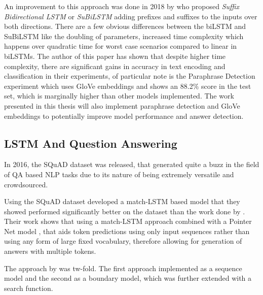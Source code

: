 \documentclass[a4paper,12pt]{report}
\begin{document}
			  An improvement to this approach was done in 2018 by \citep{lstmSubilstm} who proposed \textit{Suffix Bidirectional LSTM} or \textit{SuBiLSTM} adding prefixes and suffixes to the inputs over both directions.  There are a few obvious differences between the biLSTM and SuBiLSTM like the doubling of parameters, increased time complexity which happens over quadratic time for worst case scenarios compared to linear in biLSTMs.
			  The author of this paper has shown that despite higher time complexity, there are significant gains in accuracy in text encoding and classification in their experiments, of particular note is the Paraphrase Detection experiment which uses GloVe embeddings and shows an 88.2\% score in the test set, which is marginally higher than other models implemented.
			  The work presented in this thesis will also implement paraphrase detection and GloVe embeddings to potentially improve model performance and answer detection.

			  \subsection{LSTM And Question Answering}\label{c2lstmqa}
             In 2016, the SQuAD dataset \citep{dataset1} was released, that generated quite a buzz in the field of QA based NLP tasks due to its nature of being extremely versatile and crowdsourced.

             Using the SQuAD dataset \citep{lstmhu2016question} developed a match-LSTM \citep{lstmMatch} based model that they showed performed significantly better on the dataset than the work done by \citep{dataset1}. Their work shows that using a match-LSTM approach combined with a Pointer Net model \citep{lstmPointer}, that aids token predictions using only input sequences rather than using any form of large fixed vocabulary, therefore allowing for generation of answers with multiple tokens.

             The approach by \citep{lstmhu2016question} was tw-fold. The first approach implemented as a sequence model and the second as a boundary model, which was further extended with a search function.
\end{document}
